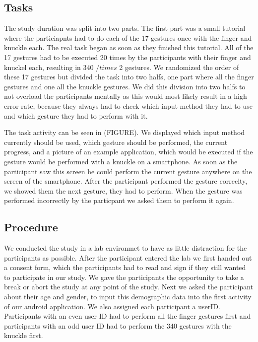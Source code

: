 \documentclass[sigchi-a, authorversion]{acmart}
\begin{document}
\subsection{Tasks}
The study duration was split into two parts.
The first part was a small tutorial where the particiapnts had to do each of the 17 gestures once with the finger and knuckle each. 
The real task began as soon as they finished this tutorial.
All of the 17 gestures had to be executed 20 times by the participants with their finger and knuckel each, resulting in 340 $/times$ 2 gestures. 
We randomized the order of these 17 gestures but divided the task into two halfs, one part where all the finger gestures and one all the knuckle gestures.
We did this division into two halfs to not overload the participants mentally as this would most likely result in a high error rate, because they always had to check which input method they had to use and which gesture they had to perform with it.

The task activity can be seen in (FIGURE).
We displayed which input method currently should be used, which gesture should be performed, the current progress, and a picture of an example application, which would be executed if the gesture would be performed with a knuckle on a smartphone.
As soon as the participant saw this screen he could perform the current gesture anywhere on the screen of the smartphone.
After the participant performed the gesture correclty, we showed them the next gesture, they had to perform.
When the gesture was performed incorrectly by the particpant we asked them to perform it again.

\subsection{Procedure}
We conducted the study in a lab environmet to have as little distraction for the participants as possible.
After the participant entered the lab we first handed out a consent form, which the participants had to read and sign if they still wanted to participate in our study.
We gave the participants the opportunity to take a break or abort the study at any point of the study.
Next we asked the participant about their age and gender, to input this demographic data into the first activity of our android application.
We also assigned each participant a userID.
Participants with an even user ID had to perform all the finger gestures first and participants with an odd user ID had to perform the 340 gestures with the knuckle first.
\end{document}
